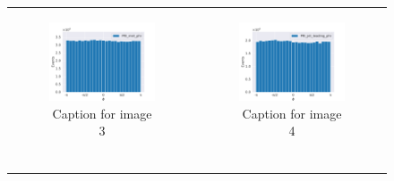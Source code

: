 \documentclass[../../main/main.tex]{subfiles}
\begin{document}
\begin{figure}
\begin{tabular}{cc}
        \begin{subfigure}[b]{0.50\textwidth}
            \centering
            \includegraphics[width=\textwidth]{../../plots/PRI_met_phi.pdf}
            \caption{Caption for image 3}
            \label{fig:sub3}
        \end{subfigure} &
        \begin{subfigure}[b]{0.50\textwidth}
            \centering
            \includegraphics[width=\textwidth]{../../plots/PRI_jet_leading_phi.pdf}
            \caption{Caption for image 4}
            \label{fig:sub4}
        \end{subfigure}  \\
        \begin{subfigure}[b]{0.50\textwidth}

\end{subfigure}
\end{tabular}
\end{figure}
\end{document}
